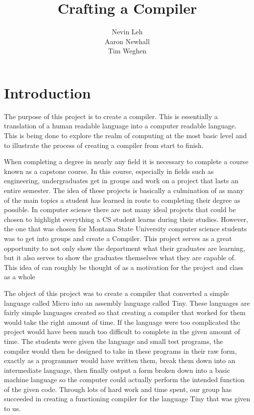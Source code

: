 \documentclass[12pt, oneside]{article}   	%
\title{Crafting a Compiler}
\author{Nevin Leh\\Aaron Newhall\\Tim Weghen}
\begin{document}
\begin{titlepage}
	\maketitle
\end{titlepage}
\setcounter{page}{2}
\tableofcontents
\section{Introduction}
The purpose of this project is to create a compiler. This is essentially a translation of a human readable language into a computer 
readable language. This is being done to explore the realm of computing at the most basic level and to illustrate the process of 
creating a compiler from start to finish.

When completing a degree in nearly any field it is necessary to complete a
course known as a capstone course. In this course, especially in fields such as
engineering, undergraduates get in groups and work on a project that lasts an
entire semester. The idea of these projects is basically a culmination of as many
of the main topics a student has learned in route to completing their degree as
possible. In computer science there are not many ideal projects that could be
chosen to highlight everything a CS student learns during their studies. However,
the one that was chosen for Montana State University computer science students
was to get into groups and create a Compiler. This project serves as a great
opportunity to not only show the department what their graduates are learning,
but it also serves to show the graduates themselves what they are capable of.
This idea of can roughly be thought of as a motivation for the project and class as
a whole

The object of this project was to create a compiler that converted a simple language called Micro into an assembly language called Tiny. These languages are fairly simple languages created so that creating a
compiler that worked for them would take the right amount of time. If the language
were too complicated the project would have been much too difficult to complete
in the given amount of time. The students were given the language and small test
programs, the compiler would then be designed to take in these programs in their
raw form, exactly as a programmer would have written them, break them down
into an intermediate language, then finally output a form broken down into a basic
machine language so the computer could actually perform the intended function
of the given code. Through lots of hard work and time spent, our group has
succeeded in creating a functioning compiler for the language Tiny that was
given to us.
\end{document}
